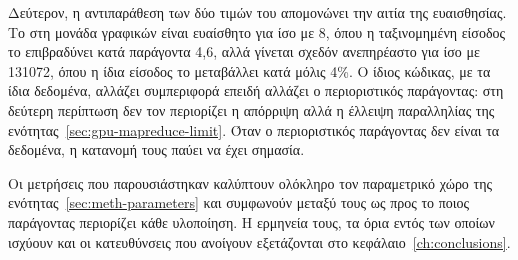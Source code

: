 Δεύτερον, η αντιπαράθεση των δύο τιμών του  απομονώνει την αιτία της
ευαισθησίας. Το  στη μονάδα γραφικών είναι ευαίσθητο για 
ίσο με 8, όπου η ταξινομημένη είσοδος το επιβραδύνει κατά παράγοντα 4,6, αλλά
γίνεται σχεδόν ανεπηρέαστο για  ίσο με 131072, όπου η ίδια είσοδος το
μεταβάλλει κατά μόλις 4\%. Ο ίδιος κώδικας, με τα ίδια δεδομένα, αλλάζει
συμπεριφορά επειδή αλλάζει ο περιοριστικός παράγοντας: στη δεύτερη περίπτωση δεν
τον περιορίζει η απόρριψη αλλά η έλλειψη παραλληλίας της
ενότητας~\ref{sec:gpu-mapreduce-limit}. Όταν ο περιοριστικός παράγοντας δεν είναι
τα δεδομένα, η κατανομή τους παύει να έχει σημασία.

Οι μετρήσεις που παρουσιάστηκαν καλύπτουν ολόκληρο τον παραμετρικό χώρο της
ενότητας~\ref{sec:meth-parameters} και συμφωνούν μεταξύ τους ως προς το ποιος
παράγοντας περιορίζει κάθε υλοποίηση. Η ερμηνεία τους, τα όρια εντός των οποίων
ισχύουν και οι κατευθύνσεις που ανοίγουν εξετάζονται στο
κεφάλαιο~\ref{ch:conclusions}.

